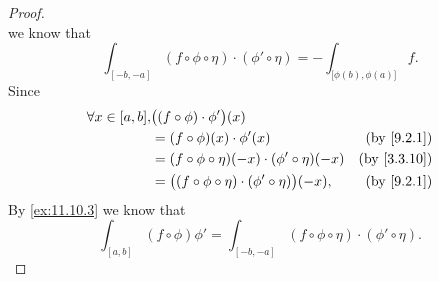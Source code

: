 \begin{proof}
\[  \]
  we know that
  \[
    \int_{[-b, -a]} (f \circ \phi \circ \eta) \cdot (\phi' \circ \eta) = -\int_{\big[\phi(b), \phi(a)\big]} f.
  \]
  Since
  \begin{align*}
    \forall x \in [a, b], & \big((f \circ \phi) \cdot \phi'\big)(x)                                                         \\
                          & = (f \circ \phi)(x) \cdot \phi'(x)                                  & \text{(by \cref{9.2.1})}  \\
                          & = (f \circ \phi \circ \eta)(-x) \cdot (\phi' \circ \eta)(-x)        & \text{(by \cref{3.3.10})} \\
                          & = \big((f \circ \phi \circ \eta) \cdot (\phi' \circ \eta)\big)(-x), & \text{(by \cref{9.2.1})}
  \end{align*}
  By \cref{ex:11.10.3} we know that
  \[
    \int_{[a, b]} (f \circ \phi) \phi' = \int_{[-b, -a]} (f \circ \phi \circ \eta) \cdot (\phi' \circ \eta).
  \]
\end{proof}